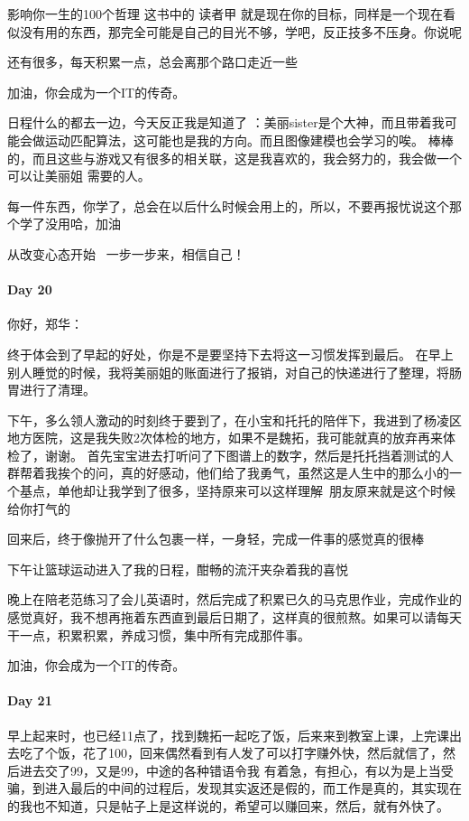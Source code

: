 \documentclass[UTF8,a4paper,8pt]{ctexart}
\begin{document}
 		  影响你一生的100个哲理 这书中的 读者甲 就是现在你的目标，同样是一个现在看似没有用的东西，那完全可能是自己的目光不够，学吧，反正技多不压身。你说呢 
 		  
 		  还有很多，每天积累一点，总会离那个路口走近一些
 		  
 		  加油，你会成为一个IT的传奇。
 		  
 		  日程什么的都去一边，今天反正我是知道了 ：美丽sister是个大神，而且带着我可能会做运动匹配算法，这可能也是我的方向。而且图像建模也会学习的唉。 棒棒的，而且这些与游戏又有很多的相关联，这是我喜欢的，我会努力的，我会做一个可以让美丽姐 需要的人。
 		  
 		  每一件东西，你学了，总会在以后什么时候会用上的，所以，不要再报忧说这个那个学了没用哈，加油
 		  
 		  从改变心态开始~ 一步一步来，相信自己！
 		  
 		  \paragraph{Day 20}
 		  你好，郑华：
 		  
 		  终于体会到了早起的好处，你是不是要坚持下去将这一习惯发挥到最后。
 		  在早上别人睡觉的时候，我将美丽姐的账面进行了报销，对自己的快递进行了整理，将肠胃进行了清理。
 		  
 		  下午，多么领人激动的时刻终于要到了，在小宝和托托的陪伴下，我进到了杨凌区地方医院，这是我失败2次体检的地方，如果不是魏拓，我可能就真的放弃再来体检了，谢谢。  首先宝宝进去打听问了下图谱上的数字，然后是托托挡着测试的人群帮着我挨个的问，真的好感动，他们给了我勇气，虽然这是人生中的那么小的一个基点，单他却让我学到了很多，坚持原来可以这样理解~朋友原来就是这个时候给你打气的~
 		  
 		  回来后，终于像抛开了什么包裹一样，一身轻，完成一件事的感觉真的很棒
 		  
 		  下午让篮球运动进入了我的日程，酣畅的流汗夹杂着我的喜悦
 		  
 		  晚上在陪老范练习了会儿英语时，然后完成了积累已久的马克思作业，完成作业的感觉真好，我不想再拖着东西直到最后日期了，这样真的很煎熬。如果可以请每天干一点，积累积累，养成习惯，集中所有完成那件事。
 		  
 		  加油，你会成为一个IT的传奇。
 		  
 		  \paragraph{Day 21}
 		  早上起来时，也已经11点了，找到魏拓一起吃了饭，后来来到教室上课，上完课出去吃了个饭，花了100，回来偶然看到有人发了可以打字赚外快，然后就信了，然后进去交了99，又是99，中途的各种错语令我 有着急，有担心，有以为是上当受骗，到进入最后的中间的过程后，发现其实返还是假的，而工作是真的，其实现在的我也不知道，只是帖子上是这样说的，希望可以赚回来，然后，就有外快了。
 		  
\end{document}
